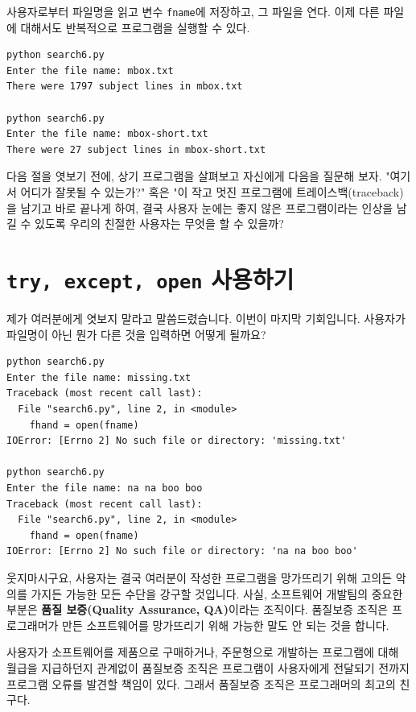 사용자로부터 파일명을 읽고 변수 {\tt fname}에 저장하고, 그 파일을 연다. 
이제 다른 파일에 대해서도 반복적으로 프로그램을 실행할 수 있다.

\beforeverb
\begin{verbatim}
python search6.py 
Enter the file name: mbox.txt
There were 1797 subject lines in mbox.txt

python search6.py 
Enter the file name: mbox-short.txt
There were 27 subject lines in mbox-short.txt
\end{verbatim}
\afterverb
%

다음 절을 엿보기 전에, 상기 프로그램을 살펴보고 자신에게 다음을 질문해 보자.
"여기서 어디가 잘못될 수 있는가?" 혹은 
"이 작고 멋진 프로그램에 트레이스백(traceback)을 남기고 바로 끝나게 하여,
결국 사용자 눈에는 좋지 않은 프로그램이라는 인상을 남길 수 있도록 우리의 친절한 사용자는 무엇을 할 수 있을까?

\section{{\tt try, except, open} 사용하기}

제가 여러분에게 엿보지 말라고 말씀드렸습니다. 이번이 마지막 기회입니다.
사용자가 파일명이 아닌 뭔가 다른 것을 입력하면 어떻게 될까요?

\beforeverb
\begin{verbatim}
python search6.py 
Enter the file name: missing.txt
Traceback (most recent call last):
  File "search6.py", line 2, in <module>
    fhand = open(fname)
IOError: [Errno 2] No such file or directory: 'missing.txt'

python search6.py 
Enter the file name: na na boo boo
Traceback (most recent call last):
  File "search6.py", line 2, in <module>
    fhand = open(fname)
IOError: [Errno 2] No such file or directory: 'na na boo boo'
\end{verbatim}
\afterverb
%

웃지마시구요, 사용자는 결국 여러분이 작성한 프로그램을 망가뜨리기 위해 고의든 악의를 가지든 가능한 모든 수단을 강구할 것입니다.
사실, 소프트웨어 개발팀의 중요한 부분은 {\bf 품질 보증(Quality Assurance, QA)}이라는 조직이다. 
품질보증 조직은 프로그래머가 만든 소프트웨어를 망가뜨리기 위해 가능한 말도 안 되는 것을 합니다.


사용자가 소프트웨어를 제품으로 구매하거나, 주문형으로 개발하는 프로그램에 대해 월급을 지급하던지 관계없이 
품질보증 조직은 프로그램이 사용자에게 전달되기 전까지 프로그램 오류를 발견할 책임이 있다.
그래서 품질보증 조직은 프로그래머의 최고의 친구다.

